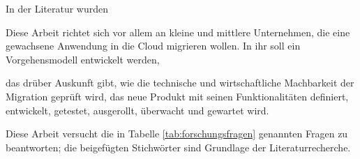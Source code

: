 In der Literatur wurden 


Diese Arbeit richtet sich vor allem an kleine und mittlere Unternehmen, die 
eine gewachsene Anwendung in die Cloud migrieren wollen. In ihr soll ein 
Vorgehensmodell entwickelt werden, 


das drüber Auskunft gibt, wie die technische 
und wirtschaftliche Machbarkeit der Migration geprüft wird, das neue Produkt 
mit seinen Funktionalitäten definiert, entwickelt, getestet, ausgerollt, 
überwacht und gewartet wird.

Diese Arbeit versucht die in Tabelle \ref{tab:forschungsfragen} genannten 
Fragen zu beantworten; die beigefügten Stichwörter sind Grundlage der 
Literaturrecherche.



\begin{comment}
Reply, das Unternehmen mit dem in Kooperation diese 
Bachelor-Thesis 
entstanden ist, ist ein an der italienischen Börse gehandeltes 
IT-Beratungsunternehmen und betrachtet sich 
als "`Living network"'\ aus hochspezialisierten Tochterunternehmen. Seit der 
Gründung 1996 konnte Reply seinen Umsatz auf über 705 Millionen Euro bei 5.245 
Angestellten im Jahr 2015 steigern. Das Netzwerk wuchs und wächst rasch: 
2016 wurden bis November drei neue Firmen aquiriert. Zwei 
Tochtergesellschaften, die schon seit mehreren Jahren Teil von Reply sind, 
möchte ich genauer vorstellen, da ihre Unternehmensprofile das 
Migrationsprojekt in dessen Rahmen diese Thesis entstanden ist, in besonderem 
Maße beeinflussen. \\
Die vormalige syskoplan AG, seit dem Erwerb 2010 \pcite{}{12}{replycompprofile} 
Syskoplan Reply, ist ein Spezialist für SAP-Applikationen und 
-Plattformen \pcite{}{10}{replycompprofile} und entwickelt seit 1999 das 
integrierte Facility Management System (iFMS). iFMS verbindet die in SAP 
hinterlegten Daten mit Gebäudeplänen und versucht Prozesse rund um die 
Verwaltung von Immobilien zu unterstützen. Die gewachsene 
Java-Anwendung mit einer Client-Server-Architektur lässt sich inzwischen nur 
noch schwer um von Kunden gewünschte Funktionen erweitern. Auch die Bedienung 
über 
eine zusätzlich zu installierenden Anwendung wirkt in Zeiten, in denen Nutzer 
es gewohnt sind, auch umfangreiche Software über den Webbrowser zu bedienen, 
anachronstisch. Beide Aspekte schränken die zukünftige
Wettbewerbsfähigkeit der Software ein. \\
Die ehemalige Arlanis Software AG wurde 2012 von Reply übernommen und ist 
Spezialist für Lösungen auf Basis des Cloud Anbieters Salesforce. 


\end{comment}
